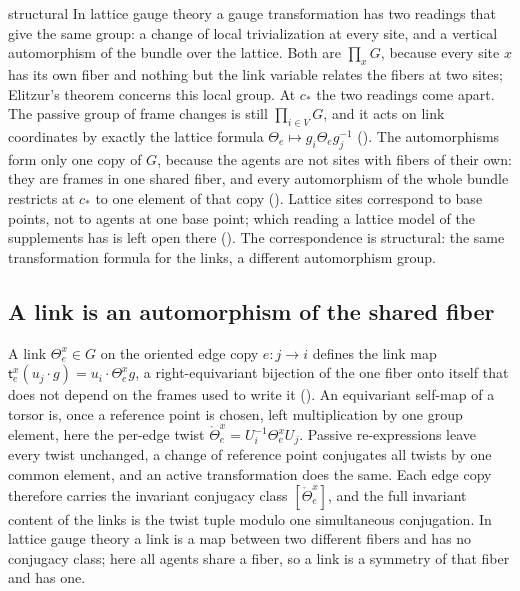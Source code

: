 \begin{analogy}{structural}
In lattice gauge theory a gauge transformation has two readings that give the same group: a change of local
trivialization at every site, and a vertical automorphism of the bundle over the lattice. Both are
$\prod_xG$, because every site $x$ has its own fiber and nothing but the link variable relates the fibers at
two sites; Elitzur's theorem \citep{elitzur1975impossibility} concerns this local group. At $c_*$ the two
readings come apart. The passive group of frame changes is still $\prod_{i\in V}G$, and it acts on link
coordinates by exactly the lattice formula $\Theta_e\mapsto g_i\Theta_eg_j^{-1}$
(). The automorphisms form only one copy of $G$, because the agents are not
sites with fibers of their own: they are frames in one shared fiber, and every automorphism of the whole
bundle restricts at $c_*$ to one element of that copy (). Lattice sites
correspond to base points, not to agents at one base point; which reading a lattice model of the supplements
has is left open there (). The correspondence is structural: the same
transformation formula for the links, a different automorphism group.
\end{analogy}

\subsection{A link is an automorphism of the shared fiber}

A link $\Theta_e^x\in G$ on the oriented edge copy $e:j\to i$ defines the link map
$\mathsf t_e^x(u_j\cdot g)=u_i\cdot\Theta_e^xg$, a right-equivariant bijection of the one fiber onto itself
that does not depend on the frames used to write it (). An equivariant
self-map of a torsor is, once a reference point is chosen, left multiplication by one group element, here
the per-edge twist $\mathring\Theta_e^x=U_i^{-1}\Theta_e^xU_j$. Passive re-expressions leave every twist
unchanged, a change of reference point conjugates all twists by one common element, and an active
transformation does the same. Each edge copy therefore carries the invariant conjugacy class
$[\mathring\Theta_e^x]$, and the full invariant content of the links is the twist tuple modulo one
simultaneous conjugation. In lattice gauge theory a link is a map between two different fibers and has no
conjugacy class; here all agents share a fiber, so a link is a symmetry of that fiber and has one.

